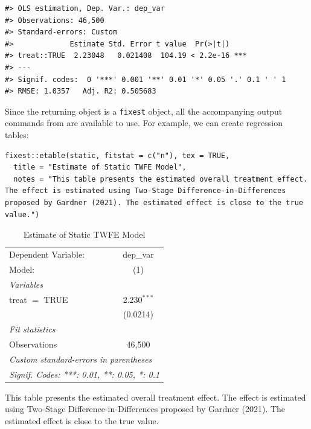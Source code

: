 \begin{verbatim}
#> OLS estimation, Dep. Var.: dep_var
#> Observations: 46,500 
#> Standard-errors: Custom 
#>             Estimate Std. Error t value  Pr(>|t|)    
#> treat::TRUE  2.23048   0.021408  104.19 < 2.2e-16 ***
#> ---
#> Signif. codes:  0 '***' 0.001 '**' 0.01 '*' 0.05 '.' 0.1 ' ' 1
#> RMSE: 1.0357   Adj. R2: 0.505683
\end{verbatim}

Since the returning object is a \texttt{fixest} object, all the accompanying output commands from  are available to use. For example, we can create regression tables:

\begin{verbatim}
fixest::etable(static, fitstat = c("n"), tex = TRUE,
  title = "Estimate of Static TWFE Model", 
  notes = "This table presents the estimated overall treatment effect. The effect is estimated using Two-Stage Difference-in-Differences proposed by Gardner (2021). The estimated effect is close to the true value.")
\end{verbatim}

\begin{table}[htbp]
   \caption{Estimate of Static TWFE Model}
   \centering
   \begin{tabular}{lc}
      \tabularnewline \midrule \midrule
      Dependent Variable: & dep\_var\\   
      Model:              & (1)\\  
      \midrule
      \emph{Variables}\\
      treat $=$ TRUE      & 2.230$^{***}$\\   
                          & (0.0214)\\   
      \midrule
      \emph{Fit statistics}\\
      Observations        & 46,500\\  
      \midrule \midrule
      \multicolumn{2}{l}{\emph{Custom standard-errors in parentheses}}\\
      \multicolumn{2}{l}{\emph{Signif. Codes: ***: 0.01, **: 0.05, *: 0.1}}\\
   \end{tabular}
   
   \par \raggedright 
   This table presents the estimated overall treatment effect. The effect is estimated using Two-Stage Difference-in-Differences proposed by Gardner (2021). The estimated effect is close to the true value.
\end{table}

